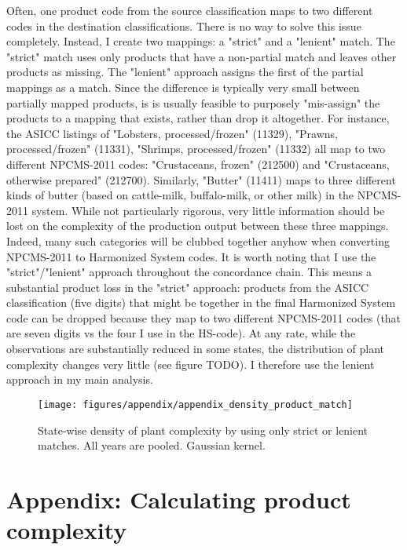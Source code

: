 \documentclass[11pt]{article}
\begin{document}
\begin{appendices}
Often, one product code from the source classification maps to two different codes in the destination classifications. There is no way to solve this issue completely. Instead, I create two mappings: a "strict" and a "lenient" match. The "strict" match uses only products that have a non-partial match and leaves other products as missing. The "lenient" approach assigns the first of the partial mappings as a match. Since the difference is typically very small between partially mapped products, is is usually feasible to purposely "mis-assign" the products to a mapping that exists, rather than drop it altogether. For instance, the ASICC listings of "Lobsters, processed/frozen" (11329), "Prawns, processed/frozen" (11331), "Shrimps, processed/frozen" (11332) all map to two different NPCMS-2011 codes: "Crustaceans, frozen" (212500) and "Crustaceans, otherwise prepared" (212700). Similarly, "Butter" (11411) maps to three different kinds of butter (based on cattle-milk, buffalo-milk, or other milk) in the NPCMS-2011 system. While not particularly rigorous, very little information should be lost on the complexity of the production output between these three mappings. Indeed, many such categories will be clubbed together anyhow when converting NPCMS-2011 to Harmonized System codes. It is worth noting that I use the "strict"/"lenient" approach throughout the concordance chain. This means a substantial product loss in the "strict" approach: products from the ASICC classification (five digits) that might be together in the final Harmonized System code can be dropped because they map to two different NPCMS-2011 codes (that are seven digits vs the four I use in the HS-code). At any rate, while the observations are substantially reduced in some states, the distribution of plant complexity changes very little (see figure TODO). I therefore use the lenient approach in my main analysis.


\begin{figure}[htpb]
	\centering
	\texttt{[image: figures/appendix/appendix\_density\_product\_match]}
	\caption[State-wise density of plant-complexity by strict or lenient product matching]{State-wise density of plant complexity by using only strict or lenient matches. All years are pooled. Gaussian kernel.}%
	\label{fig:density_product_match}
\end{figure}

\newpage

\section{Appendix: Calculating product complexity}%
\label{sub:economic_complexity_appendix}


\end{appendices}
\end{document}
